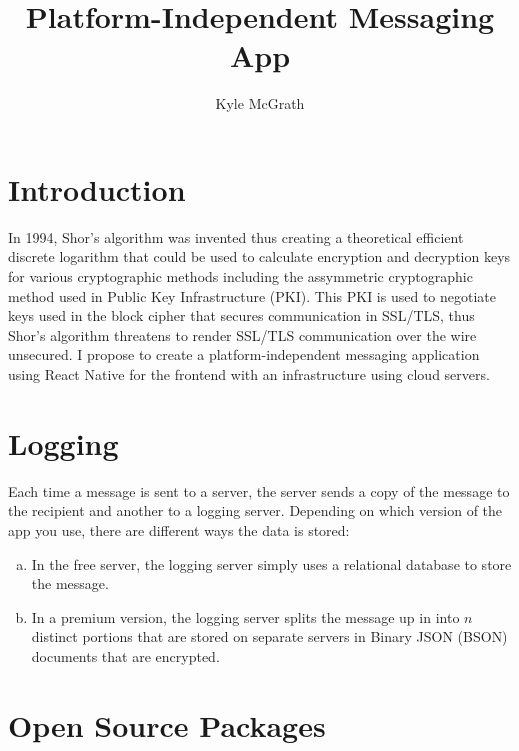 \documentclass{article}
\title{Platform-Independent Messaging App}
\author{Kyle McGrath}
\begin{document}
\maketitle

\section{Introduction}
In 1994, Shor's algorithm was invented thus creating a theoretical efficient discrete logarithm that could be used to calculate encryption and decryption keys for various cryptographic methods including the assymmetric cryptographic method used in Public Key Infrastructure (PKI). This PKI is used to negotiate keys used in the block cipher that secures communication in SSL/TLS, thus Shor's algorithm threatens to render SSL/TLS communication over the wire unsecured. I propose to create a platform-independent messaging application using React Native for the frontend with an infrastructure using cloud servers.

\section{Logging}
Each time a message is sent to a server, the server sends a copy of the message to the recipient and another to a logging server. Depending on which version of the app you use, there are different ways the data is stored:
\begin{enumerate}[(a)]
\item In the free server, the logging server simply uses a relational database to store the message. 
\item In a premium version, the logging server splits the message up in into $n$ distinct portions that are stored on separate servers in Binary JSON (BSON) documents that are encrypted. 
\end{enumerate}

\section{Open Source Packages}
\end{document}
